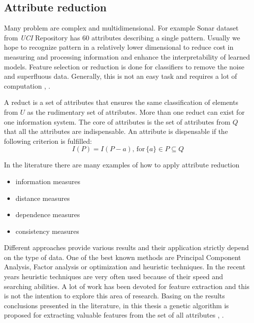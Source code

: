 \subsection{Attribute reduction}
\label{cha:Attribute_reduction}
Many problem are complex and multidimensional. For example Sonar dataset from
\textit{UCI} Repository has 60 attributes describing a single pattern. 
Usually we hope to recognize pattern in a relatively
lower dimensional to reduce cost in measuring and processing information and
enhance the interpretability of learned models. Feature selection or reduction 
is done for classifiers to remove the noise and superfluous data. Generally,
this is not an easy task and requires a lot of computation \cite{bib1}, \cite{bib5}.  

A reduct is a set of attributes that ensures the same classification of
elements from $U$ as the rudimentary set of attributes. More than one reduct
can exist for one information system. The core of attributes is the set of
attributes from $Q$ that all the attributes are indispensable. An attribute is
dispensable if the following criterion is fulfilled:
$$I(P) = I(P-{a}), \, \textrm{for} \, \{a\} \in P \subseteq  Q $$

In the literature there are many examples of how to apply attribute reduction
\begin{itemize}
    \item information measures
    \item distance measures
    \item dependence measures
    \item consistency measures
\end{itemize}
Different approaches provide various results and their application strictly
depend on the type of data. One of the best known methods are Principal
Component Analysis, Factor analysis or optimization and heuristic techniques.
In the recent years heuristic techniques are very often used because of their
speed and searching abilities. A lot of work has been devoted for feature
extraction and this is not the intention to explore this area of research.
Basing on the results conclusions presented in the literature, in this thesis a 
genetic algorithm is proposed for extracting valuable features from the set of 
all attributes \cite{bib27}, \cite{bib48}.

